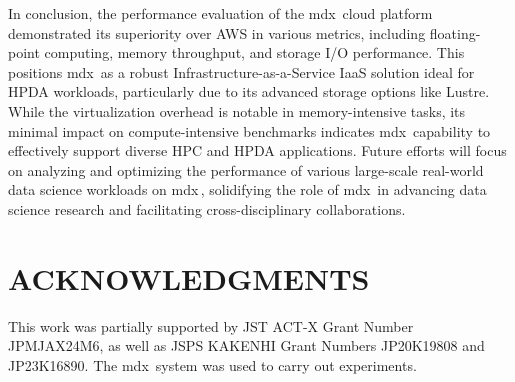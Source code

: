 \documentclass[a4paper,twoside]{article}
\newcommand{\mdx}{mdx\,\uppercase\expandafter{\romannumeral 2\relax}}
\begin{document}
In conclusion, the performance evaluation of the \mdx{} cloud platform demonstrated its superiority over AWS in various metrics, including floating-point computing, memory throughput, and storage I/O performance. This positions \mdx{} as a robust Infrastructure-as-a-Service IaaS solution ideal for HPDA workloads, particularly due to its advanced storage options like Lustre.
While the virtualization overhead is notable in memory-intensive tasks, its minimal impact on compute-intensive benchmarks indicates \mdx{} capability to effectively support diverse HPC and HPDA applications.
Future efforts will focus on analyzing and optimizing the performance of various large-scale real-world data science workloads on \mdx{}, solidifying the role of \mdx{} in advancing data science research and facilitating cross-disciplinary collaborations.

\section*{\uppercase{Acknowledgments}}

This work was partially supported by JST ACT-X Grant Number JPMJAX24M6, as well as JSPS KAKENHI
Grant Numbers JP20K19808 and JP23K16890. The \mdx{} system was used to carry out experiments.


{\small
}
\end{document}
